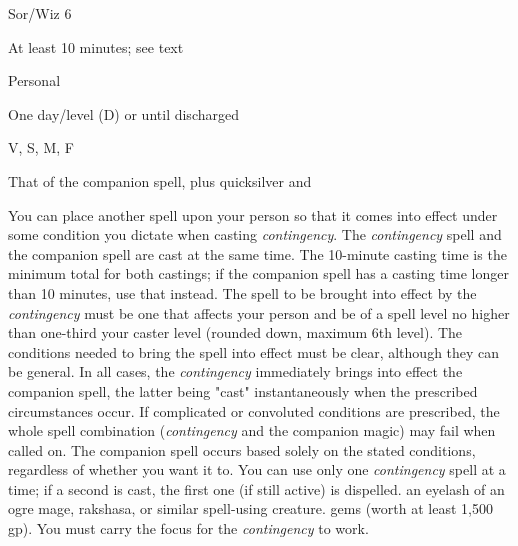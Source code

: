 
\begin{description*}
\item[Level:] Sor/Wiz 6
\item[Casting Time:] At least 10 minutes; see text
\item[Range:] Personal
\item[Duration:] One day/level (D) or until discharged
\item[Components:] V, S, M, F
\item[Arcane Material Component:] That of the companion spell, plus quicksilver and
\end{description*}

You can place another spell upon your person so that it comes into effect under
some condition you dictate when casting \textit{contingency}. The \textit{contingency
}spell and the companion spell are cast at the same time. The 10-minute casting
time is the minimum total for both castings; if the companion spell has a casting
time longer than 10 minutes, use that instead.
The spell to be brought into effect by the \textit{contingency} must be one that
affects your person and be of a spell level no higher than one-third your caster
level (rounded down, maximum 6th level).
The conditions needed to bring the spell into effect must be clear, although they
can be general. In all cases, the \textit{contingency} immediately brings into
effect the companion spell, the latter being "cast" instantaneously when the
prescribed circumstances occur. If complicated or convoluted conditions are prescribed,
the whole spell combination (\textit{contingency} and the companion magic) may
fail when called on. The companion spell occurs based solely on the stated conditions,
regardless of whether you want it to.
You can use only one \textit{contingency} spell at a time; if a second is cast,
the first one (if still active) is dispelled.
an eyelash of an ogre mage, rakshasa, or similar spell-using creature.
gems (worth at least 1,500 gp). You must carry the focus for the \textit{contingency
}to work.